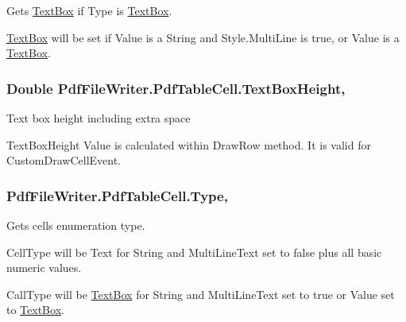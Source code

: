 Gets \hyperlink{class_pdf_file_writer_1_1_text_box}{Text\+Box} if Type is \hyperlink{class_pdf_file_writer_1_1_text_box}{Text\+Box}. 

\hyperlink{class_pdf_file_writer_1_1_text_box}{Text\+Box} will be set if Value is a String and Style.\+Multi\+Line is true, or Value is a \hyperlink{class_pdf_file_writer_1_1_text_box}{Text\+Box}. 
\subsubsection[{\texorpdfstring{Text\+Box\+Height}{TextBoxHeight}}]{\setlength{\rightskip}{0pt plus 5cm}Double Pdf\+File\+Writer.\+Pdf\+Table\+Cell.\+Text\+Box\+Height\hspace{0.3cm}{\ttfamily [get]}, {\ttfamily [set]}}\hypertarget{class_pdf_file_writer_1_1_pdf_table_cell_a40c4f80b748ce11ca1703fac05b5e287}{}\label{class_pdf_file_writer_1_1_pdf_table_cell_a40c4f80b748ce11ca1703fac05b5e287}


Text box height including extra space 

Text\+Box\+Height Value is calculated within Draw\+Row method. It is valid for Custom\+Draw\+Cell\+Event. 
\subsubsection[{\texorpdfstring{Type}{Type}}]{ Pdf\+File\+Writer.\+Pdf\+Table\+Cell.\+Type\hspace{0.3cm}{\ttfamily [get]}, {\ttfamily [set]}}\hypertarget{class_pdf_file_writer_1_1_pdf_table_cell_ab6e0b58cc352a094b9c9231c5c1b2a21}{}\label{class_pdf_file_writer_1_1_pdf_table_cell_ab6e0b58cc352a094b9c9231c5c1b2a21}


Gets cell\textquotesingle{}s enumeration type. 

Cell\+Type will be Text for String and Multi\+Line\+Text set to false plus all basic numeric values. 

Call\+Type will be \hyperlink{class_pdf_file_writer_1_1_text_box}{Text\+Box} for String and Multi\+Line\+Text set to true or Value set to \hyperlink{class_pdf_file_writer_1_1_text_box}{Text\+Box}. 

